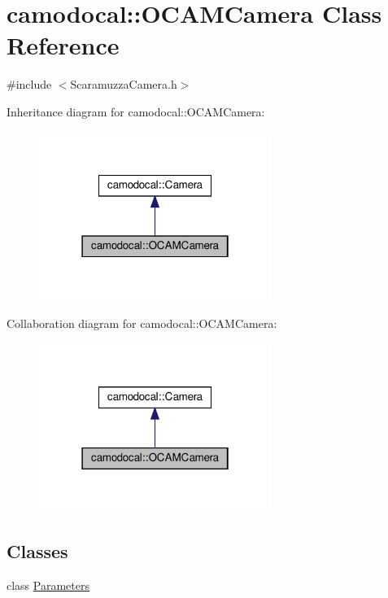 \hypertarget{classcamodocal_1_1OCAMCamera}{}\section{camodocal\+:\+:O\+C\+A\+M\+Camera Class Reference}
\label{classcamodocal_1_1OCAMCamera}


{\ttfamily \#include $<$Scaramuzza\+Camera.\+h$>$}



Inheritance diagram for camodocal\+:\+:O\+C\+A\+M\+Camera\+:\nopagebreak
\begin{figure}[H]
\begin{center}
\leavevmode
\includegraphics[width=214pt]{classcamodocal_1_1OCAMCamera__inherit__graph}
\end{center}
\end{figure}


Collaboration diagram for camodocal\+:\+:O\+C\+A\+M\+Camera\+:\nopagebreak
\begin{figure}[H]
\begin{center}
\leavevmode
\includegraphics[width=214pt]{classcamodocal_1_1OCAMCamera__coll__graph}
\end{center}
\end{figure}
\subsection*{Classes}
\begin{DoxyCompactItemize}
\item 
class \hyperlink{classcamodocal_1_1OCAMCamera_1_1Parameters}{Parameters}
\end{DoxyCompactItemize}
